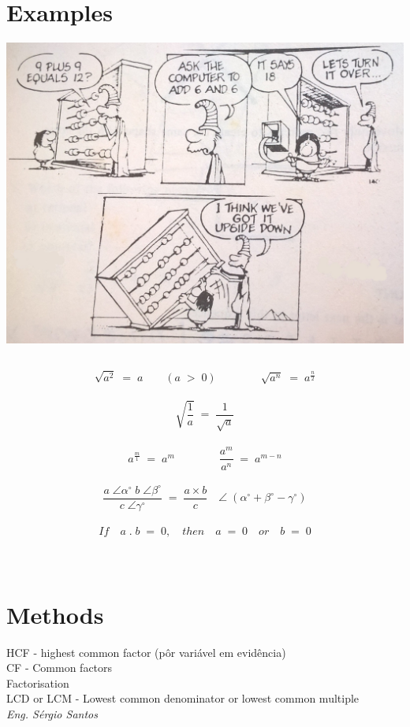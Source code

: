 \section{Examples}
\begin{minipage}{\linewidth}
	\includegraphics[scale=0.2]{./image/Math/upsidedown.jpg}
\end{minipage}
\subsection{}
\[\sqrt{a^2} \; = \; a \qquad (a \; > \; 0) \qquad \qquad \sqrt{a^n} \; = \; a^{\frac{n}{2}}\] \\
\[\sqrt{\frac{1}{a}} \; = \; \frac{1}{\sqrt{a}}\] \\
\[a^{\frac{m}{1}} \; = \; a^m \qquad \qquad \frac{a^m}{a^n} \; = \; a^{m-n}\] \\
\[\frac{a \; \angle \alpha^\circ \; b \; \angle \beta^\circ}{c \; \angle \gamma^\circ} \; = \; \frac{a \times b}{c} \quad \angle \; (\alpha^\circ + \beta^\circ - \gamma^\circ)\]
\\
\[If \quad a \; . \; b \; = \; 0, \quad then \quad a \; = \; 0 \quad or \quad b \; = \; 0\]
\\
\\








\section{Methods}
HCF - highest common factor (pôr variável em evidência) \\
CF - Common factors \\
Factorisation \\
LCD or LCM - Lowest common denominator or lowest common multiple \\
\newpage
\normalsize
\null \vfill
\textit{Eng. Sérgio Santos}


